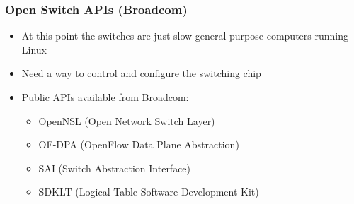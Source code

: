 \documentclass[12pt]{beamer}
\begin{document}
\begin{frame}
\frametitle{Open Switch APIs (Broadcom)}
\begin{itemize}
    \item At this point the switches are just slow general-purpose computers running Linux
    \item Need a way to control and configure the switching chip
    \vspace{5mm}
    \item Public APIs available from Broadcom:
    \begin{itemize}
        \item OpenNSL (Open Network Switch Layer)
        \item OF-DPA (OpenFlow Data Plane Abstraction)
        \item SAI (Switch Abstraction Interface)
        \item SDKLT (Logical Table Software Development Kit)
    \end{itemize}
\end{itemize}
\end{frame}
\end{document}
